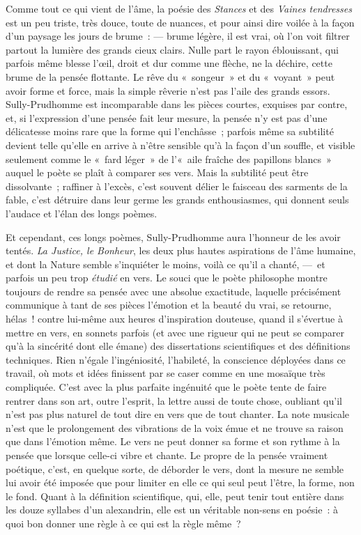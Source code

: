 \documentclass[french,twoside]{book} %
\begin{document}
\noindent Comme tout ce qui vient de l’âme, la poésie des \emph{Stances} et des \emph{Vaines tendresses} est un peu triste, très douce, toute de nuances, et pour ainsi dire voilée à la façon d’un paysage les jours de brume : — brume légère, il est vrai, où l’on voit filtrer partout la lumière des grands cieux clairs. Nulle part le rayon éblouissant, qui parfois même blesse l’œil, droit et dur comme une flèche, ne la déchire, cette brume de la pensée flottante. Le rêve du « songeur » et du « voyant » peut avoir forme et force, mais la simple rêverie n’est pas l’aile des grands essors. Sully-Prudhomme est incomparable dans les pièces courtes, exquises par contre, et, si l’expression d’une pensée fait leur mesure, la pensée n’y est pas d’une délicatesse moins rare que la forme qui l’enchâsse ; parfois même sa subtilité devient telle qu’elle en arrive à n’être sensible qu’à la façon d’un souffle, et visible seulement comme le « fard léger » de l’« aile fraîche des papillons blancs » auquel le poète se plaît à comparer ses vers. Mais la subtilité peut être dissolvante ; raffiner à l’excès, c’est souvent délier le faisceau des sarments de la fable, c’est détruire dans leur germe les grands enthousiasmes, qui donnent seuls l’audace et l’élan des longs poèmes.\par
Et cependant, ces longs poèmes, Sully-Prudhomme aura l’honneur de les avoir tentés. \emph{La Justice, le Bonheur}, les deux plus hautes aspirations de l’âme humaine, et dont la Nature semble s’inquiéter le moins, voilà ce qu’il a chanté, — et parfois un peu trop \emph{étudié} en vers. Le souci que le poète philosophe montre toujours de rendre sa pensée avec une absolue exactitude, laquelle précisément communique à tant de ses pièces l’émotion et la beauté du vrai, se retourne, hélas ! contre lui-même aux heures d’inspiration douteuse, quand il s’évertue à mettre en vers, en sonnets parfois (et avec une rigueur qui ne peut se comparer qu’à la sincérité dont elle émane) des dissertations scientifiques et des définitions techniques. Rien n’égale l’ingéniosité, l’habileté, la conscience déployées dans ce travail, où mots et idées finissent par se caser comme en une mosaïque très compliquée. C’est avec la plus parfaite ingénuité que le poète tente de faire rentrer dans son art, outre l’esprit, la lettre aussi de toute chose, oubliant qu’il n’est pas plus naturel de tout dire en vers que de tout chanter. La note musicale n’est que le prolongement des vibrations de la voix émue et ne trouve sa raison que dans l’émotion même. Le vers ne peut donner sa forme et son rythme à la pensée que lorsque celle-ci vibre et chante. Le propre de la pensée vraiment poétique, c’est, en quelque sorte, de déborder le vers, dont la mesure ne semble lui avoir été imposée que pour limiter en elle ce qui seul peut l’être, la forme, non le fond. Quant à la définition scientifique, qui, elle, peut tenir tout entière dans les douze syllabes d’un alexandrin, elle est un véritable non-sens en poésie : à quoi bon donner une règle à ce qui est la règle même ?\par
\end{document}
